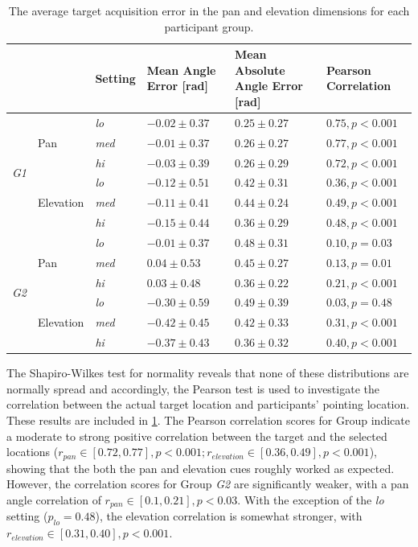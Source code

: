 \documentclass[]{interact}
\begin{document}
\begin{table}
  \centering
  \caption{The average target acquisition error in the pan and elevation dimensions for each participant group. }\label{tab:target-results}
  \begin{tabular}{p{0.5cm}p{1.3cm}p{0.9cm}p{2cm}p{2cm}p{2.25cm}}
    \toprule
    &           & Setting      & Mean Angle Error [rad] & Mean Absolute Angle Error [rad] &  Pearson Correlation \\ \midrule
    \multirow{6}{*}{\textit{G1}}
    &           & \textit{lo}  & $-0.02\pm0.37$ & $0.25\pm0.27$ & $0.75, p < 0.001$ \\
    & Pan       & \textit{med} & $-0.01\pm0.37$ & $0.26\pm0.27$ & $0.77, p < 0.001$ \\
    &           & \textit{hi}  & $-0.03\pm0.39$ & $0.26\pm0.29$ & $0.72, p < 0.001$ \\ \cline{2-6}
    &           & \textit{lo}  & $-0.12\pm0.51$ & $0.42\pm0.31$ & $0.36, p < 0.001$ \\
    & Elevation & \textit{med} & $-0.11\pm0.41$ & $0.44\pm0.24$ & $0.49, p < 0.001$ \\
    &           & \textit{hi}  & $-0.15\pm0.44$ & $0.36\pm0.29$ & $0.48, p < 0.001$ \\ \midrule
    \multirow{6}{*}{\textit{G2}}
    &           & \textit{lo}  & $-0.01\pm0.37$ & $0.48\pm0.31$ & $0.10, p = 0.03$  \\
    & Pan       & \textit{med} & $ 0.04\pm0.53$ & $0.45\pm0.27$ & $0.13, p = 0.01$  \\
    &           & \textit{hi}  & $ 0.03\pm0.48$ & $0.36\pm0.22$ & $0.21, p < 0.001$ \\\cline{2-6}
    &           & \textit{lo}  & $-0.30\pm0.59$ & $0.49\pm0.39$ & $0.03, p = 0.48$  \\
    & Elevation & \textit{med} & $-0.42\pm0.45$ & $0.42\pm0.33$ & $0.31, p < 0.001$ \\
    &           & \textit{hi}  & $-0.37\pm0.43$ & $0.36\pm0.32$ & $0.40, p < 0.001$ \\ 
    \bottomrule
  \end{tabular}
\end{table}

The Shapiro-Wilkes test for normality reveals that none of these distributions are normally spread and accordingly, the Pearson test is used to investigate the correlation between the actual target location and participants' pointing location.
These results are included in \cref{tab:target-results}.
The Pearson correlation scores for Group  indicate a moderate to strong positive correlation between the target and the selected locations ($r_{pan} \in [0.72, 0.77], p < 0.001; r_{elevation} \in [0.36, 0.49], p < 0.001$), showing that the both the pan and elevation cues roughly worked as expected.
However, the correlation scores for Group \textit{G2} are significantly weaker, with a pan angle correlation of $r_{pan} \in [0.1, 0.21], p < 0.03$.
With the exception of the \textit{lo} setting ($p_{lo} = 0.48$), the elevation correlation is somewhat stronger, with $r_{elevation} \in [0.31, 0.40], p < 0.001$.
\end{document}
